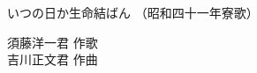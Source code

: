 \documentclass[10pt,b5j]{tarticle} %
\begin{document}
\begin{minipage}[c]{0.7\hsize} %
    \begin{center}
        {\LARGE
            いつの日か生命結ばん %
        }
        {\small 
            （昭和四十一年寮歌） %
        }
    \end{center}
\end{minipage}
\begin{minipage}[c]{0.3\hsize} %
    \begin{flushright} %
        須藤洋一君 作歌\\吉川正文君 作曲 %
    \end{flushright}
\end{minipage}
\end{document}
